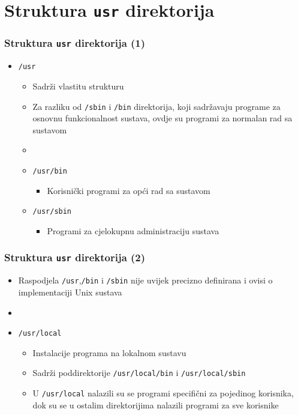 \documentclass{beamer}
\begin{document}
\section{Struktura \texttt{usr} direktorija}
\begin{frame}[t]
\frametitle{Struktura \texttt{usr} direktorija (1)}
\begin{itemize}
  \item \texttt{/usr}
  \begin{itemize}
    \item Sadrži vlastitu strukturu
    \item Za razliku od \texttt{/sbin} i \texttt{/bin} direktorija, koji
          sadržavaju programe za osnovnu funkcionalnost sustava, ovdje su
          programi za normalan rad sa sustavom
    \item[]
    \item[] \texttt{/usr/bin}
    \begin{itemize}
      \item Korisnički programi za opći rad sa sustavom
    \end{itemize}
    \item[] \texttt{/usr/sbin}
    \begin{itemize}
      \item Programi za cjelokupnu administraciju sustava
    \end{itemize}
  \end{itemize}
\end{itemize}
\end{frame}

\begin{frame}[t]
\frametitle{Struktura \texttt{usr} direktorija (2)}
\begin{itemize}
  \item Raspodjela \texttt{/usr},\texttt{/bin} i \texttt{/sbin} nije uvijek
        precizno definirana i ovisi o implementaciji Unix sustava
  \item[]
  \item[] \texttt{/usr/local}
  \begin{itemize}
    \item Instalacije programa na lokalnom sustavu
    \item Sadrži poddirektorije \texttt{/usr/local/bin} i
          \texttt{/usr/local/sbin}
    \item U \texttt{/usr/local} nalazili su se programi specifični za
          pojedinog korisnika, dok su se u ostalim direktorijima nalazili
          programi za sve korisnike
  \end{itemize}
\end{itemize}
\end{frame}
\end{document}
